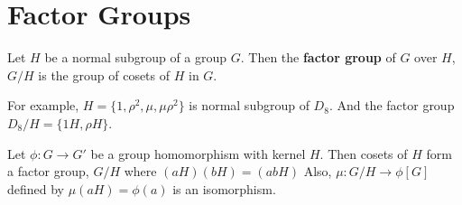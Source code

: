 \section{Factor Groups}
\begin{remark}
	Let $H$ be a normal subgroup of a group $G$. Then the \textbf{factor group} of $G$ over $H$, $G/H$ is the group of cosets of $H$ in $G$.
\end{remark}

\begin{remark}
	For example, $H = \{ 1,\rho^2,\mu,\mu\rho^2 \}$ is normal subgroup of $D_8$. And the factor group $D_8/H = \{ 1H,\rho H \}$.
\end{remark}

\begin{theorem}
	Let $\phi : G \to G'$ be a group homomorphism with kernel $H$. Then cosets of $H$ form a factor group, $G/H$ where $(aH)(bH) = (abH)$ Also, $\mu : G/H \to \phi[G]$ defined by $\mu(aH) = \phi(a)$ is an isomorphism.
\end{theorem}
